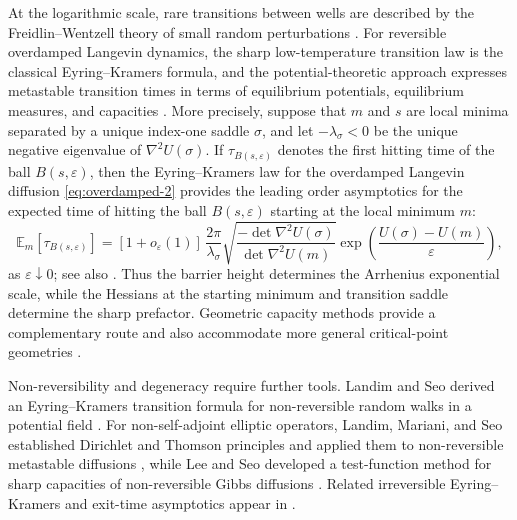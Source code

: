\documentclass[11pt]{article}
\numberwithin{equation}{section}
\theoremstyle{plain}
\theoremstyle{definition}
\theoremstyle{remark}
\newcommand{\eps}{\varepsilon}
\newcommand{\E}{\mathbb E}
\begin{document}
At the logarithmic scale, rare transitions between wells are described by the
Freidlin--Wentzell theory of small random perturbations
\cite{FreidlinWentzell2012}.  For reversible overdamped Langevin dynamics, the
sharp low-temperature transition law is the classical Eyring--Kramers formula,
and the potential-theoretic approach expresses metastable transition times in
terms of equilibrium potentials, equilibrium measures, and capacities
\cite{Berglund2013Kramers,BovierEckhoffGayrardKlein2004,BovierDenHollander2015}.
More precisely, suppose that $m$ and $s$ are local minima separated by a
unique index-one saddle $\sigma$, and let $-\lambda_\sigma<0$ be the unique
negative eigenvalue of $\nabla^2U(\sigma)$.  If
$\tau_{B(s,\eps)}$ denotes the first hitting time of the ball $B(s,\eps)$,
then the Eyring--Kramers law for the overdamped Langevin diffusion \eqref{eq:overdamped-2} provides the leading order asymptotics
for the expected time of hitting the ball $B(s,\varepsilon)$ starting at the local minimum $m$:
\begin{equation}
\label{eq:overdamped-EK-intro}
\E_m\left[\tau_{B(s,\eps)}\right]
=
[1+o_\eps(1)]\,
\frac{2\pi}{\lambda_\sigma}
\sqrt{\frac{-\det\nabla^2U(\sigma)}{\det\nabla^2U(m)}}
\exp\!\left(\frac{U(\sigma)-U(m)}{\eps}\right),
\end{equation}
as $\eps\downarrow0$; see also
\cite[Section~1.1]{LeeRamilSeo2026}.  Thus the barrier height determines the
Arrhenius exponential scale, while the Hessians at the starting minimum and
transition saddle determine the sharp prefactor.
Geometric capacity methods provide a complementary route and also accommodate
more general critical-point geometries \cite{AvelinJulinViitasaari2023}.

Non-reversibility and degeneracy require further tools.  Landim and Seo derived
an Eyring--Kramers transition formula for non-reversible random walks in a
potential field \cite{LandimSeo2018}.  For non-self-adjoint elliptic operators,
Landim, Mariani, and Seo established Dirichlet and Thomson principles and
applied them to non-reversible metastable diffusions
\cite{LandimMarianiSeo2019}, while Lee and Seo developed a test-function method
for sharp capacities of non-reversible Gibbs diffusions \cite{LeeSeo2022}.
Related irreversible Eyring--Kramers and exit-time asymptotics appear in
\cite{BouchetReygner2016,LePeutrecMichelNectoux2024}.
\end{document}
